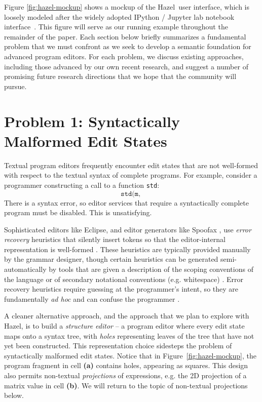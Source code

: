 \documentclass[letterpaper,USenglish]{lipics-v2016}
\newcommand{\Hazel}[0]{\textsf{Hazel}}
\newcommand{\HazelEnv}[0]{\Hazel}
\begin{document}
Figure \ref{fig:hazel-mockup} shows a mockup of the \Hazel ~user interface, which is loosely modeled after the widely adopted IPython / Jupyter lab notebook interface~\cite{PER-GRA:2007}. 
This figure will serve as our running example 
throughout the remainder of the paper. Each section below briefly summarizes a fundamental problem that we must confront as we seek to develop a semantic foundation for advanced program editors. For each problem, we discuss existing approaches, including those advanced by our own recent research, and suggest a number of promising future research directions that we hope that the community will pursue.

\section{Problem 1: Syntactically Malformed Edit States} 
Textual program editors frequently encounter edit states
that are not well-formed with respect to the textual syntax of complete
programs. For example, consider a programmer constructing a call to a function \lstinline{std}: 
\[
\texttt{std(m, }
\]
There is a syntax error, so editor services that require a syntactically
complete program must be disabled. This is unsatisfying. 

Sophisticated editors like Eclipse, and editor generators like Spoofax \cite{DBLP:conf/oopsla/KatsV10}, use \emph{error recovery} heuristics that silently insert tokens so that the editor-internal representation is well-formed \cite{DBLP:journals/siamcomp/AhoP72,charles1991practical,graham1979practical,DBLP:conf/oopsla/KatsJNV09}. These heuristics are typically provided manually by the grammar designer, though certain heuristics can be generated semi-automatically by tools that are given a description of the scoping conventions of the language or of secondary notational conventions (e.g. whitespace) \cite{DBLP:conf/oopsla/KatsJNV09,DBLP:conf/sle/JongeNKV09}. Error recovery heuristics require guessing at the programmer's intent, so they are fundamentally \emph{ad hoc} and can confuse the programmer \cite{DBLP:conf/oopsla/KatsJNV09}.

A cleaner alternative approach, and the approach that we plan to explore with \HazelEnv, is to build a
\emph{structure editor} -- a program editor where every edit state
maps onto a syntax tree, with \emph{holes} representing leaves of the tree
that have not yet been constructed.  This representation choice sidesteps the
problem of syntactically malformed edit states. Notice that in
Figure~\ref{fig:hazel-mockup}, the program fragment in cell
\textbf{(a)} contains holes, appearing as squares. This design also permits
non-textual \emph{projections} of expressions, e.g. 
the 2D projection of a matrix value in cell \textbf{(b)}.
We will return to the topic of non-textual projections below.
\end{document}
